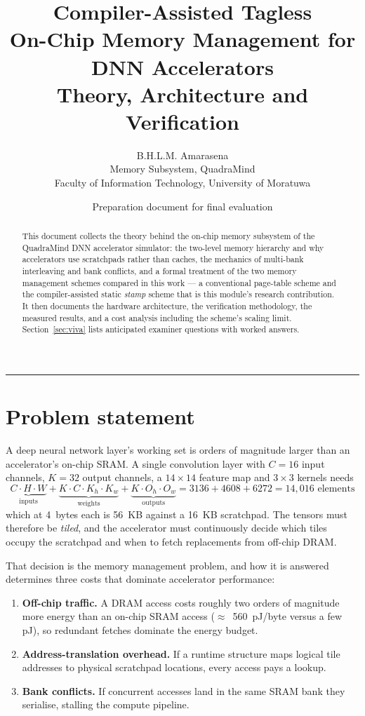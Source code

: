 \documentclass[11pt,a4paper]{article}
\title{\vspace{-1.6cm}
  \textcolor{stampblue}{\Large\bfseries Compiler-Assisted Tagless\\
  On-Chip Memory Management for DNN Accelerators}\\[0.35em]
  \large Theory, Architecture and Verification}
\author{B.H.L.M. Amarasena \\
  \small Memory Subsystem, QuadraMind \\
  \small Faculty of Information Technology, University of Moratuwa}
\date{\small Preparation document for final evaluation}
\begin{document}
\maketitle
\thispagestyle{fancy}

\begin{abstract}
\noindent
This document collects the theory behind the on-chip memory subsystem of the
QuadraMind DNN accelerator simulator: the two-level memory hierarchy and why
accelerators use scratchpads rather than caches, the mechanics of multi-bank
interleaving and bank conflicts, and a formal treatment of the two memory
management schemes compared in this work --- a conventional page-table scheme
and the compiler-assisted static \emph{stamp} scheme that is this module's
research contribution. It then documents the hardware architecture, the
verification methodology, the measured results, and a cost analysis including
the scheme's scaling limit. Section~\ref{sec:viva} lists anticipated
examiner questions with worked answers.
\end{abstract}

\tableofcontents
\vspace{0.6em}
\hrule

\section{Problem statement}

A deep neural network layer's working set is orders of magnitude larger than
an accelerator's on-chip SRAM. A single convolution layer with $C{=}16$ input
channels, $K{=}32$ output channels, a $14\times14$ feature map and $3\times3$
kernels needs
\[
  \underbrace{C \cdot H \cdot W}_{\text{inputs}} +
  \underbrace{K \cdot C \cdot K_h \cdot K_w}_{\text{weights}} +
  \underbrace{K \cdot O_h \cdot O_w}_{\text{outputs}}
  = 3136 + 4608 + 6272 = 14{,}016 \text{ elements}
\]
which at 4~bytes each is 56~KB against a 16~KB scratchpad. The tensors must
therefore be \emph{tiled}, and the accelerator must continuously decide which
tiles occupy the scratchpad and when to fetch replacements from off-chip DRAM.

That decision is the memory management problem, and how it is answered
determines three costs that dominate accelerator performance:

\begin{enumerate}[leftmargin=1.4em,itemsep=2pt]
  \item \textbf{Off-chip traffic.} A DRAM access costs roughly two orders of
        magnitude more energy than an on-chip SRAM access
        ($\approx$~560~pJ/byte versus a few pJ), so redundant fetches dominate
        the energy budget.
  \item \textbf{Address-translation overhead.} If a runtime structure maps
        logical tile addresses to physical scratchpad locations, every access
        pays a lookup.
  \item \textbf{Bank conflicts.} If concurrent accesses land in the same SRAM
        bank they serialise, stalling the compute pipeline.
\end{enumerate}
\end{document}
